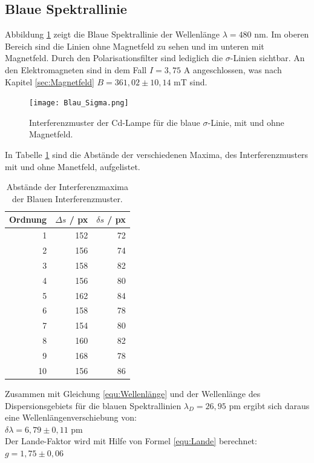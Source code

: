 \subsection{Blaue Spektrallinie}
Abbildung \ref{fig:BlauS} zeigt die Blaue Spektrallinie der Wellenlänge $\lambda = 480$ nm. 
Im oberen Bereich sind die Linien ohne Magnetfeld zu sehen und im unteren mit Magnetfeld. Durch den Polarisationsfilter sind lediglich die $\sigma$-Linien sichtbar.
An den Elektromagneten sind in dem Fall $I = 3,75$ A angeschlossen, was nach Kapitel \ref{sec:Magnetfeld} $B = 361,02 \pm 10,14$ mT sind.

\begin{figure}[H]
  \centering
  \texttt{[image: Blau\_Sigma.png]}
  \vspace{-10pt}
  \caption{Interferenzmuster der Cd-Lampe für die blaue $\sigma$-Linie, mit und ohne Magnetfeld.}
  \label{fig:BlauS}
\end{figure}
In Tabelle \ref{tab:BlauS} sind die Abstände der verschiedenen Maxima, des Interferenzmusters mit und ohne Manetfeld, aufgelistet.

\begin{table}
  \centering
  \footnotesize
  \caption{Abstände der Interferenzmaxima der Blauen Interferenzmuster.}
  \label{tab:BlauS}

  \begin{tabular}{r r r}
    \toprule
    Ordnung & $\Delta s$ / px & $\delta s$ / px\\
    \midrule
    1   & 152 & 72 \\
    2   & 156 & 74 \\
    3   & 158 & 82 \\
    4   & 156 & 80 \\
    5   & 162 & 84 \\
    6   & 158 & 78 \\
    7   & 154 & 80 \\
    8   & 160 & 82 \\
    9   & 168 & 78 \\
    10  & 156 & 86 \\
    \bottomrule
  \end{tabular}
\end{table}

Zusammen mit Gleichung \eqref{equ:Wellenlänge} und der Wellenlänge des Dispersionsgebiets für die blauen Spektrallinien $\lambda_D = 26,95$ pm ergibt sich 
daraus eine Wellenlängenverschiebung von: \\
$\delta \lambda = 6,79 \pm 0,11$ pm\\
Der Lande-Faktor wird mit Hilfe von Formel \eqref{equ:Lande} berechnet:\\
$g = 1,75 \pm 0,06$



